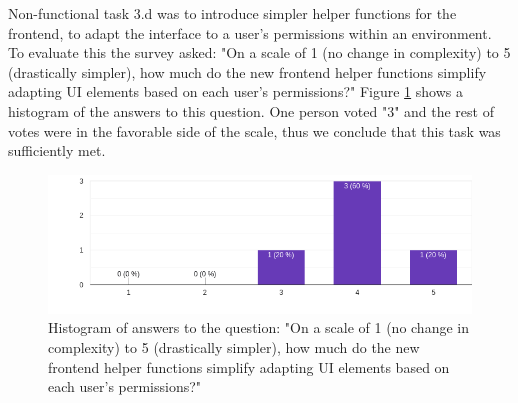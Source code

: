 
Non-functional task 3.d was to introduce simpler helper functions for the frontend, to adapt
the interface to a user's permissions within an environment. To evaluate this the survey asked: 
"On a scale of 1 (no change in complexity) to 5 (drastically simpler), how much do the new
frontend helper functions simplify adapting UI elements based on each user’s
permissions?"
Figure \ref{fig:evaluation:non-functional:3.4} shows a histogram of the answers to this question.
One person voted "3" and the rest of votes were in the favorable side of the scale,
thus we conclude that this task was sufficiently met.

\begin{figure}[h]
	\centering
  \includegraphics[scale=0.55]{../../figures/survey/3.4-frontend-permissions.png}
	\caption{Histogram of answers to the question: "On a scale of 1 (no change in complexity) to 5 (drastically simpler), how much do the new
frontend helper functions simplify adapting UI elements based on each user’s
permissions?"}
	\label{fig:evaluation:non-functional:3.4}
\end{figure}



